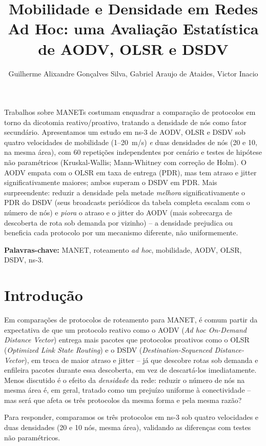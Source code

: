 \documentclass[12pt]{article}
\title{Mobilidade e Densidade em Redes Ad Hoc: uma Avaliação Estatística de AODV, OLSR e DSDV}
\author{Guilherme Alixandre Gonçalves Silva, Gabriel Araujo de Ataides, Victor Inacio}
\begin{document}
\maketitle

\begin{resumo}
Trabalhos sobre MANETs costumam enquadrar a comparação de protocolos em torno da dicotomia reativo/proativo, tratando a densidade de nós como fator secundário. Apresentamos um estudo em ns-3 de AODV, OLSR e DSDV sob quatro velocidades de mobilidade (1--20~m/s) \emph{e} duas densidades de nós (20 e 10, na mesma área), com 60 repetições independentes por cenário e testes de hipótese não paramétricos (Kruskal-Wallis; Mann-Whitney com correção de Holm). O AODV empata com o OLSR em taxa de entrega (PDR), mas tem atraso e jitter significativamente maiores; ambos superam o DSDV em PDR. Mais surpreendente: reduzir a densidade pela metade \emph{melhora} significativamente o PDR do DSDV (seus broadcasts periódicos da tabela completa escalam com o número de nós) e \emph{piora} o atraso e o jitter do AODV (mais sobrecarga de descoberta de rota sob demanda por vizinho) -- a densidade prejudica ou beneficia cada protocolo por um mecanismo diferente, não uniformemente.
\end{resumo}

\noindent\textbf{Palavras-chave:} MANET, roteamento \textit{ad hoc}, mobilidade, AODV, OLSR, DSDV, ns-3.

\section{Introdução}

Em comparações de protocolos de roteamento para MANET, é comum partir da expectativa de que um protocolo reativo como o AODV (\textit{Ad hoc On-Demand Distance Vector}) entrega mais pacotes que protocolos proativos como o OLSR (\textit{Optimized Link State Routing}) e o DSDV (\textit{Destination-Sequenced Distance-Vector}), em troca de maior atraso e jitter -- já que descobre rotas sob demanda e enfileira pacotes durante essa descoberta, em vez de descartá-los imediatamente. Menos discutido é o efeito da \emph{densidade} da rede: reduzir o número de nós na mesma área é, em geral, tratado como um prejuízo uniforme à conectividade -- mas será que afeta os três protocolos da mesma forma e pela mesma razão?

Para responder, comparamos os três protocolos em ns-3 sob quatro velocidades e duas densidades (20 e 10 nós, mesma área), validando as diferenças com testes não paramétricos.
\end{document}
